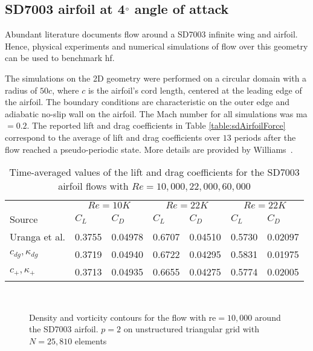 \graphicspath{{\aiaadir /figures_SD7003/}}%

\subsection{SD7003 airfoil at 4$^{\circ}$ angle of attack}\label{sd7003airfoil}

Abundant literature documents flow around a SD7003 infinite wing and airfoil. Hence, physical experiments \cite{ol2005comparison,radespiel2007numerical} and numerical simulations \cite{galbraith2008implicit,visbal2009high,castonguay2010simulation,persson2011high,uranga2011implicit} of flow over this geometry can be used to benchmark \gls{hf}.

The simulations on the 2D geometry were performed on a circular domain with a radius of $50c$, where $c$ is the airfoil's cord length, centered at the leading edge of the airfoil. The boundary conditions are characteristic on the outer edge and adiabatic no-slip wall on the airfoil. The Mach number for all simulations was \gls{ma}$= 0.2$. The reported lift and drag coefficients in Table \eqref{table:sdAirfoilForce} correspond to the average of lift and drag coefficients over $13$ periods after the flow reached a pseudo-periodic state. More details are provided by Williams~\cite{williams2013thesis}. 

\begin{table}[htbp]
\centering
\begin{tabular}{ l| l l| l l| l l} 
  
 &  \multicolumn{2}{|c|}{$Re = 10K$}  & \multicolumn{2}{|c|}{$Re = 22K$} & \multicolumn{2}{|c}{$Re = 22K$}  \\ 
 Source & $C_L$ & $C_D$ & $C_L$ & $C_D$ & $C_L$ & $C_D$   \\ 
\hline
 Uranga et al.\cite{uranga2011implicit} & 0.3755 & 0.04978 & 0.6707 & 0.04510 & 0.5730 & 0.02097  \\ 
$c_{dg},\kappa_{dg}$ & 0.3719 & 0.04940 & 0.6722 & 0.04295 & 0.5831 & 0.01975 \\ 
$c_{+},\kappa_{+}$ & 0.3713 & 0.04935 & 0.6655 & 0.04275 & 0.5774 & 0.02005  \\ 
 \end{tabular}
\caption{Time-averaged values of the lift and drag coefficients for the SD7003 airfoil flows with $Re = 10,000, 22,000, 60,000$}
\label{table:sdAirfoilForce} 
 \end{table}

\begin{figure}[htbp]
\centering
{}
\\

\caption{Density and vorticity contours for the flow with \gls{re}$= 10,000$ around the SD7003 airfoil. $p=2$ on unstructured triangular grid with $N = 25,810$ elements}
\label{sdairfoilre10k}
\end{figure}

